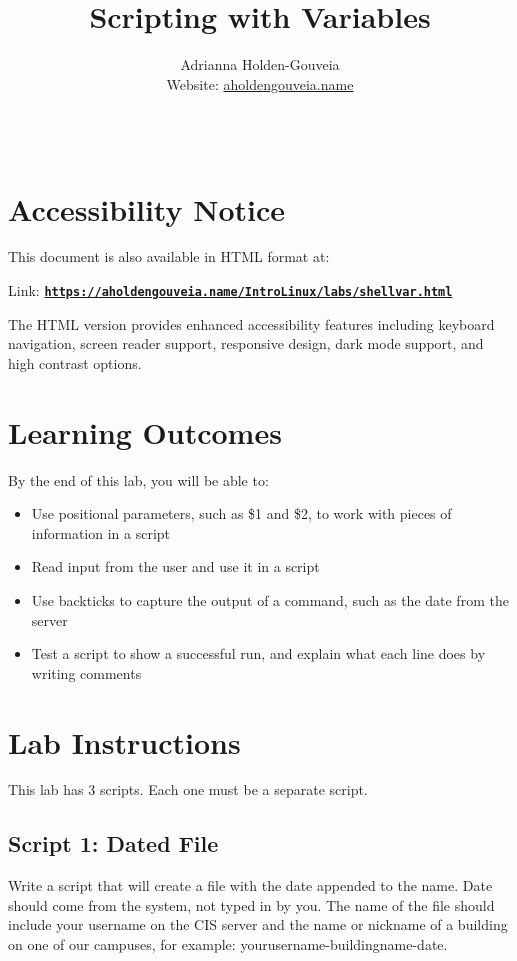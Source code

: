 \documentclass[12pt]{article}
\title{Scripting with Variables}
\author{
        Adrianna Holden-Gouveia \\
        Website: \href{https://aholdengouveia.name}{aholdengouveia.name}\\ 
        \date{\vspace{-5ex}}
        \faGithub {: aholdengouveia} \\
        }
\begin{document}
    

\maketitle

\section*{Accessibility Notice}
This document is also available in HTML format at:

Link: \href{https://aholdengouveia.name/IntroLinux/labs/shellvar.html}{\textbf{\nolinkurl{https://aholdengouveia.name/IntroLinux/labs/shellvar.html}}}

The HTML version provides enhanced accessibility features including keyboard navigation, screen reader support, responsive design, dark mode support, and high contrast options.



\section*{Learning Outcomes}
By the end of this lab, you will be able to:
\begin{itemize}
    \item Use positional parameters, such as \$1 and \$2, to work with pieces of information in a script
    \item Read input from the user and use it in a script
    \item Use backticks to capture the output of a command, such as the date from the server
    \item Test a script to show a successful run, and explain what each line does by writing comments
\end{itemize}
\section*{Lab Instructions}
This lab has 3 scripts. Each one must be a separate script.

\subsection*{Script 1: Dated File}
Write a script that will create a file with the date appended to the name. Date should come from the system, not typed in by you.  The name of the file should include your username on the CIS server and the name or nickname of a building on one of our campuses, for example: yourusername-buildingname-date.
\end{document}
